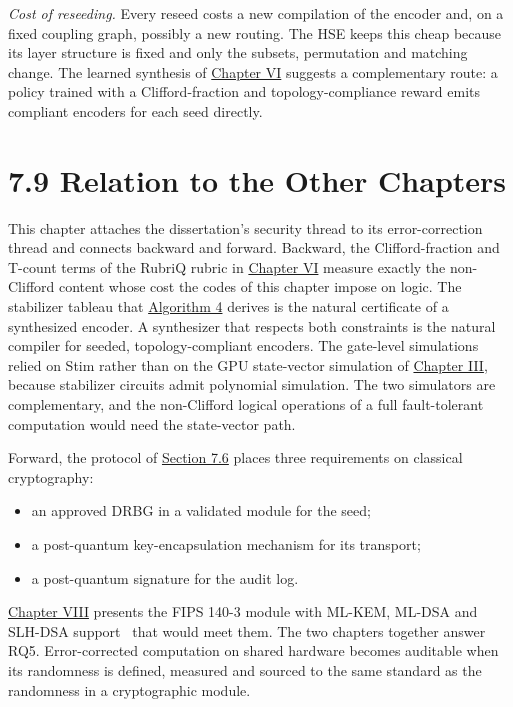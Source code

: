 \documentclass{report}
\theoremstyle{plain}
\theoremstyle{definition}
\theoremstyle{remark}
\begin{document}
\emph{Cost of reseeding.} Every reseed costs a new compilation of the encoder and, on a fixed coupling graph, possibly a new routing. The HSE keeps this cheap because its layer structure is fixed and only the subsets, permutation and matching change. The learned synthesis of \hyperref[ch:synthesis]{Chapter VI} suggests a complementary route: a policy trained with a Clifford-fraction and topology-compliance reward emits compliant encoders for each seed directly.

\section{7.9 Relation to the Other Chapters}\label{sec:qec:relation}

This chapter attaches the dissertation's security thread to its error-correction thread and connects backward and forward. Backward, the Clifford-fraction and T-count terms of the RubriQ rubric in \hyperref[ch:synthesis]{Chapter VI} measure exactly the non-Clifford content whose cost the codes of this chapter impose on logic. The stabilizer tableau that \hyperref[alg:qec:audit]{Algorithm 4} derives is the natural certificate of a synthesized encoder. A synthesizer that respects both constraints is the natural compiler for seeded, topology-compliant encoders. The gate-level simulations relied on Stim rather than on the GPU state-vector simulation of \hyperref[ch:qgear]{Chapter III}, because stabilizer circuits admit polynomial simulation. The two simulators are complementary, and the non-Clifford logical operations of a full fault-tolerant computation would need the state-vector path.

Forward, the protocol of \hyperref[sec:qec:protocol]{Section 7.6} places three requirements on classical cryptography:
\begin{itemize}
  \item an approved DRBG in a validated module for the seed;
  \item a post-quantum key-encapsulation mechanism for its transport;
  \item a post-quantum signature for the audit log.
\end{itemize}
\hyperref[ch:pqc]{Chapter VIII} presents the FIPS 140-3 module with ML-KEM, ML-DSA and SLH-DSA support~\cite{guo2026lightriderqpc} that would meet them. The two chapters together answer RQ5. Error-corrected computation on shared hardware becomes auditable when its randomness is defined, measured and sourced to the same standard as the randomness in a cryptographic module.
\end{document}
